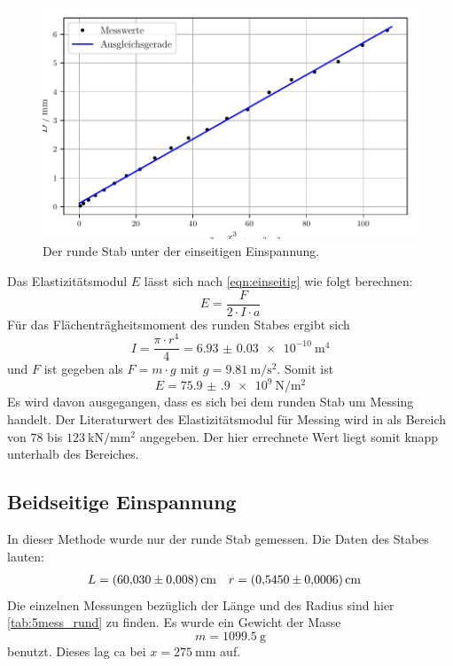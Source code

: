 \begin{figure}
  \centering
  \includegraphics[width=\textwidth]{build/plotm1.pdf}
  \caption{Der runde Stab unter der einseitigen Einspannung.}
  \label{fig:plot1m}
\end{figure}
Das Elastizitätsmodul $E$ lässt sich nach \eqref{eqn:einseitig}
wie folgt berechnen:
\begin{equation*}
  E = \frac{F}{2 \cdot I \cdot a}
\end{equation*}
Für das Flächenträgheitsmoment des runden Stabes ergibt sich
\begin{equation}\label{eqn:Trägheitsmoment_rund}
  I = \frac{\pi \cdot r^4}{4} = \SI{6.93(3)e-10}{\metre\tothe{4}}
\end{equation} 
und $F$ ist gegeben als $F = m \cdot g$ mit $g = \SI{9.81}{\metre\per\second\squared}$.
Somit ist 
\begin{equation*}
  E = \SI{75.9(9)e9}{\newton\per\metre\squared}
\end{equation*}
Es wird davon ausgegangen, dass es sich bei dem runden Stab um Messing handelt.
Der Literaturwert des Elastizitätsmodul für Messing wird in \cite{chemie.de} als Bereich von $\num{78}$ bis $\SI{123}{\kilo\newton\per\milli\metre\squared}$ angegeben.
Der hier errechnete Wert liegt somit knapp unterhalb des Bereiches.

\subsection{Beidseitige Einspannung}
In dieser Methode wurde nur der runde Stab gemessen. Die Daten des Stabes lauten:
\begin{align*}
  L &= \SI{60.03\pm 0.008}{\centi\metre} & r &= \SI{0.545\pm 0.0006}{\centi\metre}
\end{align*}
Die einzelnen Messungen bezüglich der Länge und des Radius sind hier \ref{tab:5mess_rund} zu finden. 
Es wurde ein Gewicht der Masse 
\begin{equation*}
  m = \SI{1099.5}{\gram}
\end{equation*}
benutzt. Dieses lag ca bei $x = \SI{275}{\milli\metre}$ auf.

